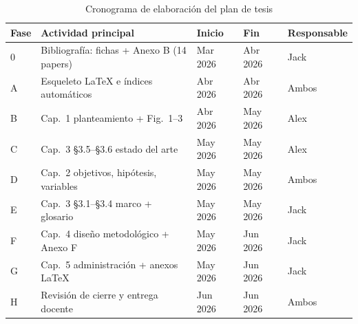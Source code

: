 \begin{table}[H]
  \centering
  \caption{Cronograma de elaboración del plan de tesis}
  \label{tab:cronograma}
  \small
  \begin{tabular}{@{}p{}p{}p{}p{}p{}@{}}
    \toprule
    \textbf{Fase} & \textbf{Actividad principal} & \textbf{Inicio} & \textbf{Fin} & \textbf{Responsable} \\
    \midrule
    0 & Bibliografía: fichas + Anexo B (14 papers) & Mar 2026 & Abr 2026 & Jack \\
    A & Esqueleto LaTeX e índices automáticos & Abr 2026 & Abr 2026 & Ambos \\
    B & Cap.~1 planteamiento + Fig.~1--3 & Abr 2026 & May 2026 & Alex \\
    C & Cap.~3 §3.5--§3.6 estado del arte & May 2026 & May 2026 & Alex \\
    D & Cap.~2 objetivos, hipótesis, variables & May 2026 & May 2026 & Ambos \\
    E & Cap.~3 §3.1--§3.4 marco + glosario & May 2026 & May 2026 & Jack \\
    F & Cap.~4 diseño metodológico + Anexo F & May 2026 & Jun 2026 & Jack \\
    G & Cap.~5 administración + anexos LaTeX & May 2026 & Jun 2026 & Jack \\
    H & Revisión de cierre y entrega docente & Jun 2026 & Jun 2026 & Ambos \\
    \bottomrule
  \end{tabular}
\end{table}
